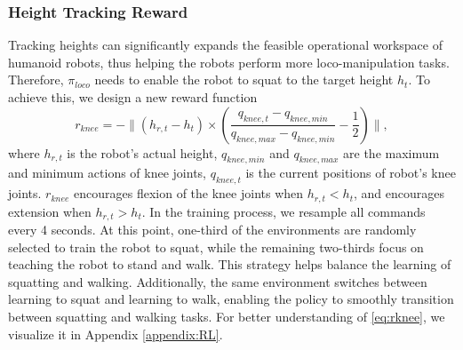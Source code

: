 \subsubsection{Height Tracking Reward}
\label{sec:height}
Tracking heights can significantly expands the feasible operational workspace of humanoid robots, thus helping the robots perform more loco-manipulation tasks. Therefore, $\pi_{loco}$ needs to enable the robot to squat to the target height $h_t$. To achieve this, we design a new reward function
\begin{equation}
\label{eq:rknee}
    r_{knee} = -\|(h_{r,t}-h_{t})\times(\frac{q_{knee,t}-q_{knee,min}}{q_{knee,max}-q_{knee,min}}-\frac{1}{2})\|,
\end{equation}
where $h_{r,t}$ is the robot's actual height, $q_{knee,min}$ and $q_{knee,max}$ are the maximum and minimum actions of knee joints, $q_{knee,t}$ is the current positions of robot's knee joints. $r_{knee}$ encourages flexion of the knee joints when $h_{r,t}< h_t$, and encourages extension when $h_{r,t}> h_t$. In the training process, we resample all commands every 4 seconds. At this point, one-third of the environments are randomly selected to train the robot to squat, while the remaining two-thirds focus on teaching the robot to stand and walk. This strategy helps balance the learning of squatting and walking. Additionally, the same environment switches between learning to squat and learning to walk, enabling the policy to smoothly transition between squatting and walking tasks. For better understanding of \cref{eq:rknee}, we visualize it in Appendix \ref{appendix:RL}.

